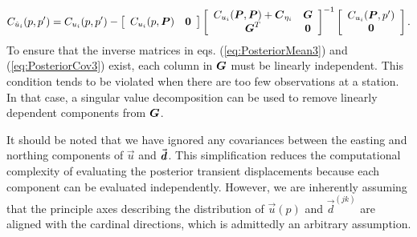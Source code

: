 \documentclass[extra,mreferee]{gji}
\begin{document}
\begin{equation}\label{eq:PosteriorCov3}
C_{\post_i}(p,p') = C_{u_i}(p,p') - 
                    \left[\begin{array}{cc}
                          C_{u_i}(p,\points) & \zeros \\
                          \end{array}\right]
                    \left[\begin{array}{cc}
                          C_{u_i}(\points,\points) + \mitbf{C}_{\eta_i} & \G \\
                          \G^T  & \zeros \\
                          \end{array}\right]^{-1}
                    \left[\begin{array}{c}
                          C_{u_i}(\points,p') \\
                          \zeros \\
                          \end{array}\right].
\end{equation}
To ensure that the inverse matrices in eqs. (\ref{eq:PosteriorMean3})
and (\ref{eq:PosteriorCov3}) exist, each column in $\G$ must be
linearly independent. This condition tends to be violated when there
are too few observations at a station. In that case, a singular value
decomposition can be used to remove linearly dependent components from
$\G$.

It should be noted that we have ignored any covariances between the
easting and northing components of $\vec{u}$ and $\vec{\data}$.
This simplification reduces the computational complexity of evaluating
the posterior transient displacements because each component can be
evaluated independently. However, we are inherently assuming that the
principle axes describing the distribution of $\vec{u}(p)$ and
$\vec{d}^{(jk)}$ are aligned with the cardinal directions, which is
admittedly an arbitrary assumption.
\end{document}
